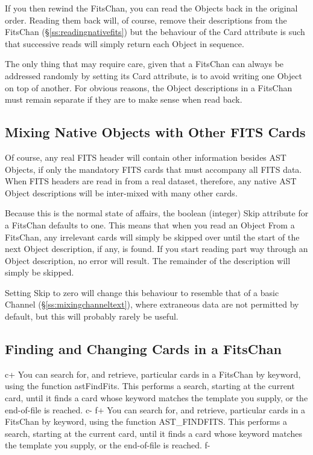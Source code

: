 \documentclass[twoside,11pt]{article}
\newcommand{\secref}[1]{\S\ref{#1}}
\newcommand{\secref}[1]{\ref{#1}}
\begin{document}
If you then rewind the FitsChan, you can read the Objects back in the
original order. Reading them back will, of course, remove their
descriptions from the FitsChan (\secref{ss:readingnativefits}) but the
behaviour of the Card attribute is such that successive reads will
simply return each Object in sequence.

The only thing that may require care, given that a FitsChan can always
be addressed randomly by setting its Card attribute, is to avoid
writing one Object on top of another. For obvious reasons, the Object
descriptions in a FitsChan must remain separate if they are to make
sense when read back.

\subsection{Mixing Native Objects with Other FITS Cards}

Of course, any real FITS header will contain other information besides
AST Objects, if only the mandatory FITS cards that must accompany all
FITS data. When FITS headers are read in from a real dataset,
therefore, any native AST Object descriptions will be inter-mixed with
many other cards.

Because this is the normal state of affairs, the boolean (integer)
Skip attribute for a FitsChan defaults to one. This means that when
you read an Object From a FitsChan, any irrelevant cards will simply
be skipped over until the start of the next Object description, if
any, is found. If you start reading part way through an Object
description, no error will result. The remainder of the description
will simply be skipped.

Setting Skip to zero will change this behaviour to resemble that of a
basic Channel (\secref{ss:mixingchanneltext}), where extraneous data
are not permitted by default, but this will probably rarely be useful.

\subsection{\label{ss:findingandchangingfits}Finding and Changing Cards in a FitsChan}

c+
You can search for, and retrieve, particular cards in a FitsChan by
keyword, using the function astFindFits. This performs a search,
starting at the current card, until it finds a card whose keyword
matches the template you supply, or the end-of-file is reached.
c-
f+
You can search for, and retrieve, particular cards in a FitsChan by
keyword, using the function AST\_FINDFITS. This performs a search,
starting at the current card, until it finds a card whose keyword
matches the template you supply, or the end-of-file is reached.
f-
\end{document}
